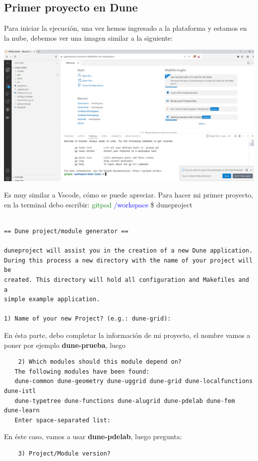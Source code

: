 \documentclass{scrarticle}
\begin{document}
\subsection[Prier Proyecto]{Primer proyecto en Dune}
Para iniciar la ejecución, una vez hemos ingresado a la plataforma y estamos en la nube, debemos ver una imagen similar 
a la siguiente:
\begin{center}\label{fig:ingreso}
	\includegraphics[scale=0.3]{PantallaIngreso.png}
\end{center}
Es muy similar a Vscode, cómo se puede apreciar.  Para hacer mi primer proyecto, en la terminal debo escribir:
\textcolor{green}{gitpod} \textcolor{blue}{/workspace} \$ duneproject 
\begin{verbatim}

== Dune project/module generator ==

duneproject will assist you in the creation of a new Dune application.
During this process a new directory with the name of your project will be
created. This directory will hold all configuration and Makefiles and a
simple example application.

1) Name of your new Project? (e.g.: dune-grid): 
\end{verbatim}
En ésta parte, debo completar la información de mi proyecto, el nombre vamos a poner por ejemplo \textbf{dune-prueba}, luego
\begin{verbatim}
	2) Which modules should this module depend on?
   The following modules have been found:
   dune-common dune-geometry dune-uggrid dune-grid dune-localfunctions dune-istl 
   dune-typetree dune-functions dune-alugrid dune-pdelab dune-fem dune-learn 
   Enter space-separated list:
\end{verbatim}
En éste caso, vamos a usar \textbf{dune-pdelab}, luego pregunta:
\begin{verbatim}
	3) Project/Module version? 
\end{verbatim}
\end{document}
